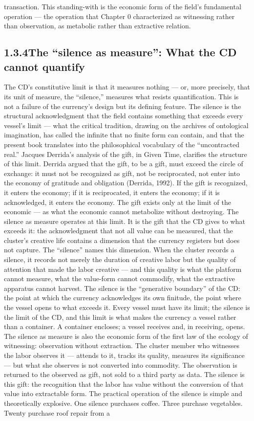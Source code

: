 transaction. This standing-with is the economic form of the field’s fundamental operation — the operation that Chapter 0 characterized as witnessing rather than observation, as metabolic rather than extractive relation.

\subsection{1.3.4\quad The “silence as measure”: What the CD cannot quantify}

The CD’s constitutive limit is that it measures nothing — or, more precisely, that its unit of measure, the “silence,” measures what resists quantification. This is not a failure of the currency’s design but its defining feature. The silence is the structural acknowledgment that the field contains something that exceeds every vessel’s limit — what the critical tradition, drawing on the archives of ontological imagination, has called the infinite that no finite form can contain, and that the present book translates into the philosophical vocabulary of the “uncontracted real.” Jacques Derrida’s analysis of the gift, in Given Time, clarifies the structure of this limit. Derrida argued that the gift, to be a gift, must exceed the circle of exchange: it must not be recognized as gift, not be reciprocated, not enter into the economy of gratitude and obligation (Derrida, 1992). If the gift is recognized, it enters the economy; if it is reciprocated, it enters the economy; if it is acknowledged, it enters the economy. The gift exists only at the limit of the economic — as what the economic cannot metabolize without destroying. The silence as measure operates at this limit. It is the gift that the CD gives to what exceeds it: the acknowledgment that not all value can be measured, that the cluster’s creative life contains a dimension that the currency registers but does not capture. The “silence” names this dimension. When the cluster records a silence, it records not merely the duration of creative labor but the quality of attention that made the labor creative — and this quality is what the platform cannot measure, what the value-form cannot commodify, what the extractive apparatus cannot harvest. The silence is the “generative boundary” of the CD: the point at which the currency acknowledges its own finitude, the point where the vessel opens to what exceeds it. Every vessel must have its limit; the silence is the limit of the CD, and this limit is what makes the currency a vessel rather than a container. A container encloses; a vessel receives and, in receiving, opens. The silence as measure is also the economic form of the first law of the ecology of witnessing: observation without extraction. The cluster member who witnesses the labor observes it — attends to it, tracks its quality, measures its significance — but what she observes is not converted into commodity. The observation is returned to the observed as gift, not sold to a third party as data. The silence is this gift: the recognition that the labor has value without the conversion of that value into extractable form. The practical operation of the silence is simple and theoretically explosive. One silence purchases coffee. Three purchase vegetables. Twenty purchase roof repair from a 